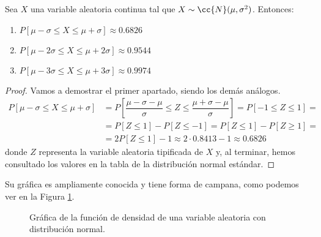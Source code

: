 \begin{teo}
    Sea $X$ una variable aleatoria continua tal que $X\sim \cc{N}(\mu,\sigma^2)$. Entonces:
    \begin{enumerate}
        \item $P[\mu-\sigma\leq X\leq \mu+\sigma] \approx 0.6826$
        \item $P[\mu-2\sigma\leq X\leq \mu+2\sigma] \approx 0.9544$
        \item $P[\mu-3\sigma\leq X\leq \mu+3\sigma] \approx 0.9974$
    \end{enumerate}
\end{teo}
\begin{proof}
    Vamos a demostrar el primer apartado, siendo los demás análogos.
    \begin{align*}
        P[\mu-\sigma\leq X\leq \mu+\sigma] &= P\left[\dfrac{\mu-\sigma-\mu}{\sigma} \leq Z\leq \dfrac{\mu+\sigma-\mu}{\sigma}\right]
        = P[-1\leq Z\leq 1] =\\&= P[Z\leq 1] - P[Z\leq -1]
        = P[Z\leq 1] -P[Z\geq 1]=\\&= 2P[Z\leq 1] -1 \approx 2\cdot 0.8413-1 \approx 0.6826
    \end{align*}
    donde $Z$ representa la variable aleatoria tipificada de $X$ y,
    al terminar, hemos consultado los valores en la tabla de la distribución normal estándar.
\end{proof}

Su gráfica es ampliamente conocida y tiene forma de campana, como podemos ver en la Figura \ref{fig:normal}.
\begin{figure}[H]
    \centering
    \caption{Gráfica de la función de densidad de una variable aleatoria con distribución normal.}
    \label{fig:normal}
\end{figure}


